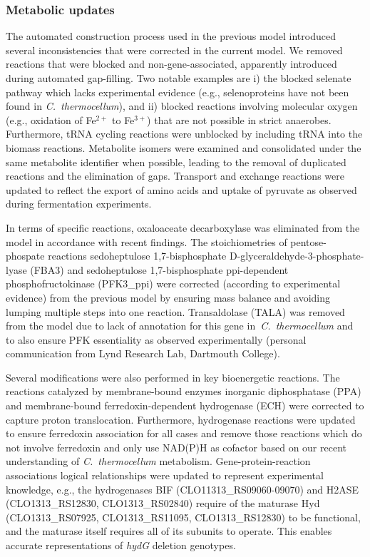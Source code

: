 \subsubsection{Metabolic updates}

The automated construction process used in the previous model introduced several inconsistencies that were corrected in the current model. We removed reactions that were blocked and non-gene-associated, apparently introduced during automated gap-filling. Two notable examples are i) the blocked selenate pathway which lacks experimental evidence (e.g., selenoproteins have not been found in \textit{C.~thermocellum}), and ii) blocked reactions involving molecular oxygen (e.g., oxidation of Fe$^{2+}$ to Fe$^{3+}$) that are not possible in strict anaerobes. Furthermore, tRNA cycling reactions were unblocked by including tRNA into the biomass reactions.\citep{reimers2017}
Metabolite isomers were examined and consolidated under the same metabolite identifier when possible, leading to the removal of duplicated reactions and the elimination of gaps.
Transport and exchange reactions were updated to reflect the export of amino acids and uptake of pyruvate as observed during fermentation experiments.\citep{holwerda2014}

In terms of specific reactions, oxaloaceate decarboxylase was eliminated from the model in accordance with recent findings.\citep{olson2017}
The stoichiometries of pentose-phospate reactions sedoheptulose 1,7-bisphosphate D-glyceraldehyde-3-phosphate-lyase (FBA3) and sedoheptulose 1,7-bisphosphate ppi-dependent phosphofructokinase (PFK3\_ppi) were corrected (according to experimental evidence\citep{rydzak2012}) from the previous model by ensuring mass balance and avoiding lumping multiple steps into one reaction.
Transaldolase (TALA) was removed from the model due to lack of annotation for this gene in \textit{C.~thermocellum} and to also ensure PFK essentiality as observed experimentally (personal communication from Lynd Research Lab, Dartmouth College).

Several modifications were also performed in key bioenergetic reactions.
The reactions catalyzed by membrane-bound enzymes inorganic diphosphatase (PPA) \citep{zhou2013} and
membrane-bound ferredoxin-dependent hydrogenase (ECH)\citep{calusinska2010}
were corrected to capture proton translocation.
Furthermore, hydrogenase reactions were updated to ensure ferredoxin association for all cases and remove those reactions which do not involve ferredoxin and only use NAD(P)H as cofactor based on our recent understanding of \textit{C.~thermocellum} metabolism.\citep{biswas2017} %
Gene-protein-reaction associations logical relationships were updated to
represent experimental knowledge, e.g., the hydrogenases BIF (CLO11313\_RS09060-09070) and H2ASE (CLO1313\_RS12830, CLO1313\_RS02840) require of the maturase Hyd (CLO1313\_RS07925, CLO1313\_RS11095, CLO1313\_RS12830) to be functional, and the maturase itself requires all of its subunits to operate. This enables accurate representations of \textit{hydG} deletion genotypes.\citep{biswas2015}

